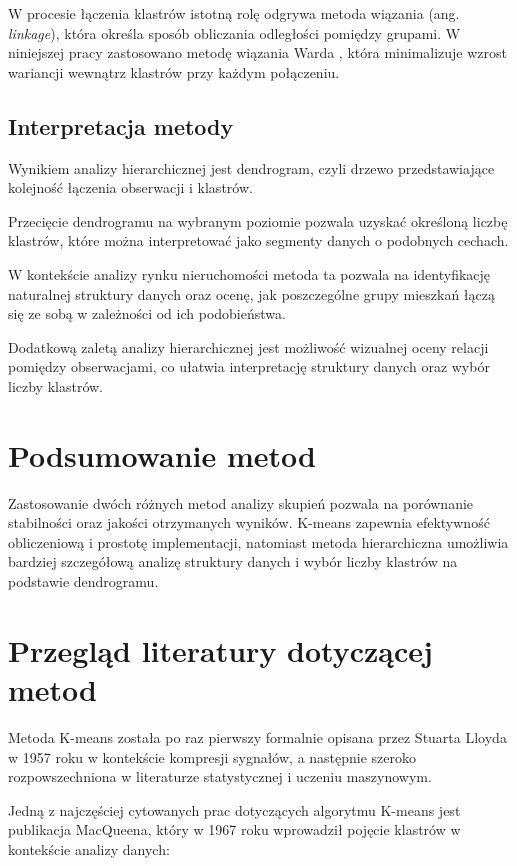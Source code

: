 \documentclass{report}
\begin{document}
W procesie łączenia klastrów istotną rolę odgrywa metoda wiązania (ang. \textit{linkage}), która określa sposób obliczania odległości pomiędzy grupami. W niniejszej pracy zastosowano metodę wiązania Warda \cite{ward1963}, która minimalizuje wzrost wariancji wewnątrz klastrów przy każdym połączeniu.

\subsection{Interpretacja metody}

Wynikiem analizy hierarchicznej jest dendrogram, czyli drzewo przedstawiające kolejność łączenia obserwacji i klastrów.

Przecięcie dendrogramu na wybranym poziomie pozwala uzyskać określoną liczbę klastrów, które można interpretować jako segmenty danych o podobnych cechach.

W kontekście analizy rynku nieruchomości metoda ta pozwala na identyfikację naturalnej struktury danych oraz ocenę, jak poszczególne grupy mieszkań łączą się ze sobą w zależności od ich podobieństwa.

Dodatkową zaletą analizy hierarchicznej jest możliwość wizualnej oceny relacji pomiędzy obserwacjami, co ułatwia interpretację struktury danych oraz wybór liczby klastrów.

\section{Podsumowanie metod}

Zastosowanie dwóch różnych metod analizy skupień pozwala na porównanie stabilności oraz jakości otrzymanych wyników. K-means zapewnia efektywność obliczeniową i prostotę implementacji, natomiast metoda hierarchiczna umożliwia bardziej szczegółową analizę struktury danych i wybór liczby klastrów na podstawie dendrogramu.

\section{Przegląd literatury dotyczącej metod}

Metoda K-means została po raz pierwszy formalnie opisana przez Stuarta Lloyda w 1957 roku w kontekście kompresji sygnałów, a następnie szeroko rozpowszechniona w literaturze statystycznej i uczeniu maszynowym.

Jedną z najczęściej cytowanych prac dotyczących algorytmu K-means jest publikacja MacQueena, który w 1967 roku wprowadził pojęcie klastrów w kontekście analizy danych:
\end{document}
